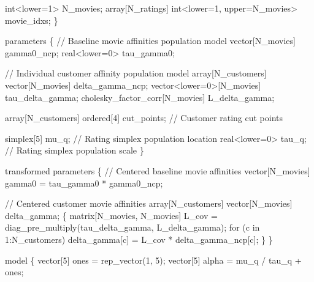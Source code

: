 \documentclass[
  letterpaper,
  DIV=11,
  numbers=noendperiod]{scrartcl}
\newenvironment{Shaded}{\begin{snugshade}}{\end{snugshade}}
\newcommand{\CommentTok}[1]{\textcolor[rgb]{0.37,0.37,0.37}{#1}}
\newcommand{\ControlFlowTok}[1]{\textcolor[rgb]{0.00,0.23,0.31}{#1}}
\newcommand{\DataTypeTok}[1]{\textcolor[rgb]{0.68,0.00,0.00}{#1}}
\newcommand{\DecValTok}[1]{\textcolor[rgb]{0.68,0.00,0.00}{#1}}
\newcommand{\KeywordTok}[1]{\textcolor[rgb]{0.00,0.23,0.31}{#1}}
\newcommand{\NormalTok}[1]{\textcolor[rgb]{0.00,0.23,0.31}{#1}}
\begin{document}
\begin{codelisting}
\begin{Shaded}
\begin{Highlighting}[]
  \DataTypeTok{int}\NormalTok{\textless{}}\KeywordTok{lower}\NormalTok{=}\DecValTok{1}\NormalTok{\textgreater{} N\_movies;}
  \DataTypeTok{array}\NormalTok{[N\_ratings] }\DataTypeTok{int}\NormalTok{\textless{}}\KeywordTok{lower}\NormalTok{=}\DecValTok{1}\NormalTok{, }\KeywordTok{upper}\NormalTok{=N\_movies\textgreater{} movie\_idxs;}
\NormalTok{\}}

\KeywordTok{parameters}\NormalTok{ \{}
  \CommentTok{// Baseline movie affinities population model}
  \DataTypeTok{vector}\NormalTok{[N\_movies] gamma0\_ncp;}
  \DataTypeTok{real}\NormalTok{\textless{}}\KeywordTok{lower}\NormalTok{=}\DecValTok{0}\NormalTok{\textgreater{} tau\_gamma0;}

  \CommentTok{// Individual customer affinity population model}
  \DataTypeTok{array}\NormalTok{[N\_customers] }\DataTypeTok{vector}\NormalTok{[N\_movies] delta\_gamma\_ncp;}
  \DataTypeTok{vector}\NormalTok{\textless{}}\KeywordTok{lower}\NormalTok{=}\DecValTok{0}\NormalTok{\textgreater{}[N\_movies] tau\_delta\_gamma;}
  \DataTypeTok{cholesky\_factor\_corr}\NormalTok{[N\_movies] L\_delta\_gamma;}

  \DataTypeTok{array}\NormalTok{[N\_customers] }\DataTypeTok{ordered}\NormalTok{[}\DecValTok{4}\NormalTok{] cut\_points; }\CommentTok{// Customer rating cut points}

  \DataTypeTok{simplex}\NormalTok{[}\DecValTok{5}\NormalTok{] mu\_q;     }\CommentTok{// Rating simplex population location}
  \DataTypeTok{real}\NormalTok{\textless{}}\KeywordTok{lower}\NormalTok{=}\DecValTok{0}\NormalTok{\textgreater{} tau\_q; }\CommentTok{// Rating simplex population scale}
\NormalTok{\}}

\KeywordTok{transformed parameters}\NormalTok{ \{}
  \CommentTok{// Centered baseline movie affinities}
  \DataTypeTok{vector}\NormalTok{[N\_movies] gamma0 = tau\_gamma0 * gamma0\_ncp;}

  \CommentTok{// Centered customer movie affinities}
  \DataTypeTok{array}\NormalTok{[N\_customers] }\DataTypeTok{vector}\NormalTok{[N\_movies] delta\_gamma;}
\NormalTok{  \{}
    \DataTypeTok{matrix}\NormalTok{[N\_movies, N\_movies] L\_cov}
\NormalTok{      = diag\_pre\_multiply(tau\_delta\_gamma, L\_delta\_gamma);}
    \ControlFlowTok{for}\NormalTok{ (c }\ControlFlowTok{in} \DecValTok{1}\NormalTok{:N\_customers)}
\NormalTok{      delta\_gamma[c] = L\_cov * delta\_gamma\_ncp[c];}
\NormalTok{  \}}
\NormalTok{\}}

\KeywordTok{model}\NormalTok{ \{}
  \DataTypeTok{vector}\NormalTok{[}\DecValTok{5}\NormalTok{] ones = rep\_vector(}\DecValTok{1}\NormalTok{, }\DecValTok{5}\NormalTok{);}
  \DataTypeTok{vector}\NormalTok{[}\DecValTok{5}\NormalTok{] alpha = mu\_q / tau\_q + ones;}


\end{Highlighting}
\end{Shaded}
\end{codelisting}
\end{document}
